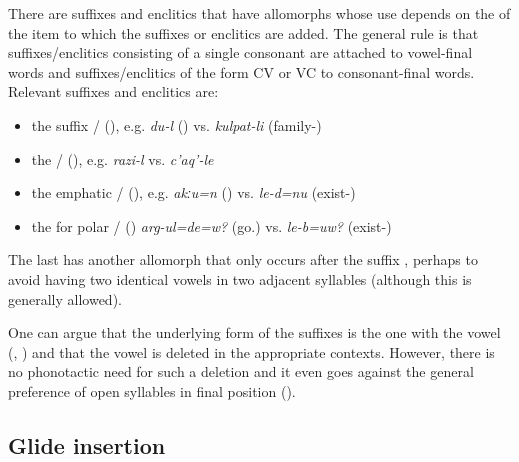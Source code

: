 There are suffixes and enclitics that have allomorphs whose use depends on the  of the item to which the suffixes or enclitics are added. The general rule is that suffixes\slash enclitics consisting of a single consonant are attached to vowel-final words and suffixes\slash enclitics of the form CV or VC to consonant-final words. Relevant suffixes and enclitics are:
%
\begin{itemize}
	\item	the  suffix \slash{} (), e.g. \textit{du-l} () vs. \textit{kulpat-li} (family-)
	\item	the  \slash{} (), e.g. \textit{razi-l}  vs. \textit{c'aq'-le} 
	\item	the emphatic  \slash{} (), e.g. \textit{akːu=n} () vs. \textit{le-d=nu} (exist-)
	\item	the  for polar  \slash{} () \textit{arg-ul=de=w?} (go.)  vs. \textit{le-b=uw?} (exist-) 
\end{itemize}

The last  has another allomorph  that only occurs after the  suffix , perhaps to avoid having two identical vowels in two adjacent syllables (although this is generally allowed).

One can argue that the underlying form of the suffixes is the one with the vowel (, ) and that the vowel is deleted in the appropriate contexts. However, there is no phonotactic need for such a deletion and it even goes against the general preference of open syllables in final position ().



\subsection{Glide insertion}
\label{ssec:Glide insertion}

